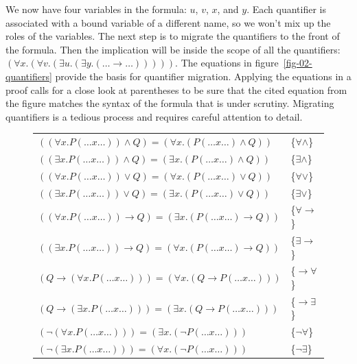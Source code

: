 {{We now have four variables in the formula: $u$, $v$, $x$, and $y$.
Each quantifier is associated with a bound variable of a different name,
so we won't mix up the roles of the variables.
The next step is to migrate the quantifiers to the front of the formula.
Then the implication will be inside the scope of all the quantifiers:
$(\forall x.(\forall v.(\exists u.(\exists y.(\dots\rightarrow\dots)))))$.
The equations in figure~\ref{fig-02-quantifiers}
provide the basis for quantifier migration.
Applying the equations in a proof calls for a close look
at parentheses to be sure that the cited equation from
the figure matches the syntax of the formula that is under scrutiny.
Migrating quantifiers is a tedious process and requires
careful attention to detail.

\begin{figure}
\begin{center}
\begin{tabular}{ll}
$((\forall x.P(\dots x \dots)) \wedge Q) = (\forall x.(P(\dots x \dots) \wedge Q))$               & \{$\forall\wedge$\} \\
$((\exists x.P(\dots x \dots)) \wedge Q) = (\exists x.(P(\dots x \dots) \wedge Q))$               & \{$\exists\wedge$\} \\
$((\forall x.P(\dots x \dots)) \vee Q) = (\forall x.(P(\dots x \dots) \vee Q))$                   & \{$\forall\vee$\} \\
$((\exists x.P(\dots x \dots)) \vee Q) = (\exists x.(P(\dots x \dots) \vee Q))$                   & \{$\exists\vee$\} \\
$((\forall x.P(\dots x \dots)) \rightarrow Q) = (\exists x.(P(\dots x \dots) \rightarrow Q))$     & \{${\forall}{\rightarrow}$\} \\
$((\exists x.P(\dots x \dots)) \rightarrow Q) = (\forall x.(P(\dots x \dots) \rightarrow Q))$     & \{${\exists}{\rightarrow}$\} \\
$(Q \rightarrow (\forall x.P(\dots x \dots))) = (\forall x.(Q \rightarrow P(\dots x \dots)))$     & \{${\rightarrow}{\forall}$\} \\
$(Q \rightarrow (\exists x.P(\dots x \dots))) = (\exists x.(Q \rightarrow P(\dots x \dots)))$     & \{${\rightarrow}{\exists}$\} \\
$(\neg (\forall x.P(\dots x \dots))) = (\exists x.(\neg P(\dots x \dots)))$                       & \{$\neg\forall$\} \\
$(\neg (\exists x.P(\dots x \dots))) = (\forall x.(\neg P(\dots x \dots)))$                       & \{$\neg\exists$\} \\

\end{tabular}
\end{center}
\end{figure}}}
